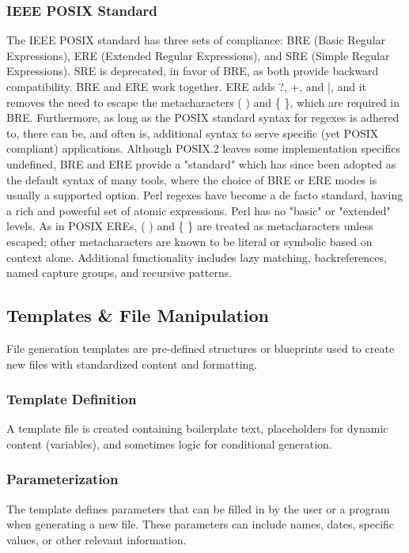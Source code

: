 \subsubsection{IEEE POSIX Standard}
The IEEE POSIX standard has three sets of compliance: BRE (Basic Regular Expressions), ERE (Extended Regular Expressions), and SRE (Simple Regular Expressions). SRE is deprecated, in favor of BRE, as both provide backward compatibility.
BRE and ERE work together. ERE adds ?, +, and |, and it removes the need to escape the metacharacters ( ) and \{ \}, which are required in BRE. Furthermore, as long as the POSIX standard syntax for regexes is adhered to, there can be, and often is, additional syntax to serve specific (yet POSIX compliant) applications. Although POSIX.2 leaves some implementation specifics undefined, BRE and ERE provide a "standard" which has since been adopted as the default syntax of many tools, where the choice of BRE or ERE modes is usually a supported option.
Perl regexes have become a de facto standard, having a rich and powerful set of atomic expressions. Perl has no "basic" or "extended" levels. As in POSIX EREs, ( ) and \{ \} are treated as metacharacters unless escaped; other metacharacters are known to be literal or symbolic based on context alone. Additional functionality includes lazy matching, backreferences, named capture groups, and recursive patterns.

\subsection{Templates \& File Manipulation}
File generation templates are pre-defined structures or blueprints used to create new files with standardized content and formatting.
\subsubsection{Template Definition}
A template file is created containing boilerplate text, placeholders for dynamic content (variables), and sometimes logic for conditional generation.
\subsubsection{Parameterization}
The template defines parameters that can be filled in by the user or a program when generating a new file. These parameters can include names, dates, specific values, or other relevant information.
